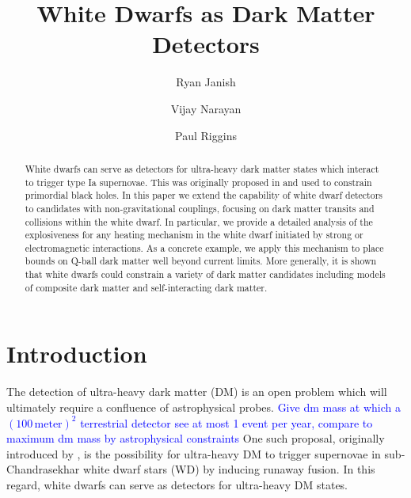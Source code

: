 \documentclass[twocolumn,showpacs,preprintnumbers,amsmath,amssymb,prd]{revtex4}
\begin{document}
\title{White Dwarfs as Dark Matter Detectors}


\author{Ryan Janish}

\author{Vijay Narayan}

\author{Paul Riggins}

\begin{abstract}

White dwarfs can serve as detectors for ultra-heavy dark matter states which interact to trigger type Ia supernovae. This was originally proposed in \cite{Graham:2015apa} and used to  constrain primordial black holes. In this paper we extend the capability of white dwarf detectors to candidates with non-gravitational couplings, focusing on dark matter transits and collisions within the white dwarf. In particular, we provide a detailed analysis of the explosiveness for any heating mechanism in the white dwarf initiated by strong or electromagnetic interactions. As a concrete example, we apply this mechanism to place bounds on Q-ball dark matter well beyond current limits. More generally, it is shown that white dwarfs could constrain a variety of dark matter candidates including models of composite dark matter and self-interacting dark matter.


\end{abstract}
\maketitle


\section{Introduction}
\label{sec:Introduction}

The detection of ultra-heavy dark matter (DM) is an open problem which will ultimately require a confluence of astrophysical probes. \textcolor{blue}{Give dm mass at which a $(100\,\text{meter})^2$ terrestrial detector see at most 1 event per year, compare to maximum dm mass by astrophysical constraints}  One such proposal, originally introduced by \cite{Graham:2015apa}, is the possibility for ultra-heavy DM to trigger supernovae in sub-Chandrasekhar white dwarf stars (WD) by inducing runaway fusion.  In this regard, white dwarfs can serve as detectors for ultra-heavy DM states.
\end{document}
